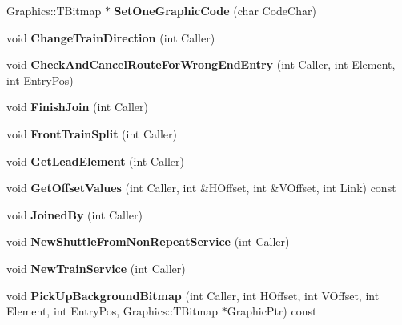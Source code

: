 \begin{DoxyCompactItemize}
\item 
\mbox{\label{class_t_train_ad7831e71f0c68933df4aea6661a77be5}} 
Graphics\+::\+T\+Bitmap $\ast$ {\bfseries Set\+One\+Graphic\+Code} (char Code\+Char)
\item 
\mbox{\label{class_t_train_a406c172a0ba96802ada1aa04d78948d0}} 
void {\bfseries Change\+Train\+Direction} (int Caller)
\item 
\mbox{\label{class_t_train_a50997f7e8138a7e6a147fe3b5ad21b84}} 
void {\bfseries Check\+And\+Cancel\+Route\+For\+Wrong\+End\+Entry} (int Caller, int Element, int Entry\+Pos)
\item 
\mbox{\label{class_t_train_ab9edf458753619f8cd25f0165484d26f}} 
void {\bfseries Finish\+Join} (int Caller)
\item 
\mbox{\label{class_t_train_ad666fb061d1da7c44a72ec963c2098aa}} 
void {\bfseries Front\+Train\+Split} (int Caller)
\item 
\mbox{\label{class_t_train_a0675ea1dede706d5b0dd52264496865a}} 
void {\bfseries Get\+Lead\+Element} (int Caller)
\item 
\mbox{\label{class_t_train_aa973b7a0ecaef5077fd56398419f9104}} 
void {\bfseries Get\+Offset\+Values} (int Caller, int \&H\+Offset, int \&V\+Offset, int Link) const
\item 
\mbox{\label{class_t_train_a6c3479378d35f9041c38d80f03686b41}} 
void {\bfseries Joined\+By} (int Caller)
\item 
\mbox{\label{class_t_train_a56fcfe4b9a3cef988bbeb4f4766372aa}} 
void {\bfseries New\+Shuttle\+From\+Non\+Repeat\+Service} (int Caller)
\item 
\mbox{\label{class_t_train_a75a2e9017b96e2a8f2a1edbd01c2cd68}} 
void {\bfseries New\+Train\+Service} (int Caller)
\item 
\mbox{\label{class_t_train_af92ae73f1be23475e7ae424306cd4866}} 
void {\bfseries Pick\+Up\+Background\+Bitmap} (int Caller, int H\+Offset, int V\+Offset, int Element, int Entry\+Pos, Graphics\+::\+T\+Bitmap $\ast$Graphic\+Ptr) const

\end{DoxyCompactItemize}
